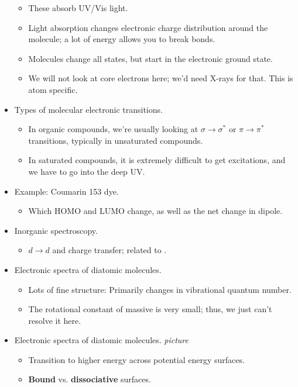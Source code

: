 \documentclass[../notes.tex]{subfiles}
\begin{document}
\begin{itemize}
\begin{itemize}
        \item These absorb UV/Vis light.
        \item Light absorption changes electronic charge distribution around the molecule; a lot of energy allows you to break bonds.
        \item Molecules change all states, but start in the electronic ground state.
        \item We will not look at core electrons here; we'd need X-rays for that. This is atom specific.
    \end{itemize}
    \item Types of molecular electronic transitions.
    \begin{itemize}
        \item In organic compounds, we're usually looking at $\sigma\to\sigma^*$ or $\pi\to\pi^*$ transitions, typically in unsaturated compounds.
        \item In saturated compounds, it is extremely difficult to get excitations, and we have to go into the deep UV.
    \end{itemize}
    \item Example: Coumarin 153 dye.
    \begin{itemize}
        \item Which HOMO and LUMO change, as well as the net change in dipole.
    \end{itemize}
    \item Inorganic spectroscopy.
    \begin{itemize}
        \item $d\to d$ and charge transfer; related to .
    \end{itemize}
    \item Electronic spectra of diatomic molecules.
    \begin{itemize}
        \item Lots of fine structure: Primarily changes in vibrational quantum number.
        \item The rotational constant of massive  is very small; thus, we just can't resolve it here.
    \end{itemize}
    \item Electronic spectra of diatomic molecules.
    \emph{picture}
    \begin{itemize}
        \item Transition to higher energy across potential energy surfaces.
        \item \textbf{Bound} vs. \textbf{dissociative} surfaces.

\end{itemize}
\end{itemize}
\end{document}
